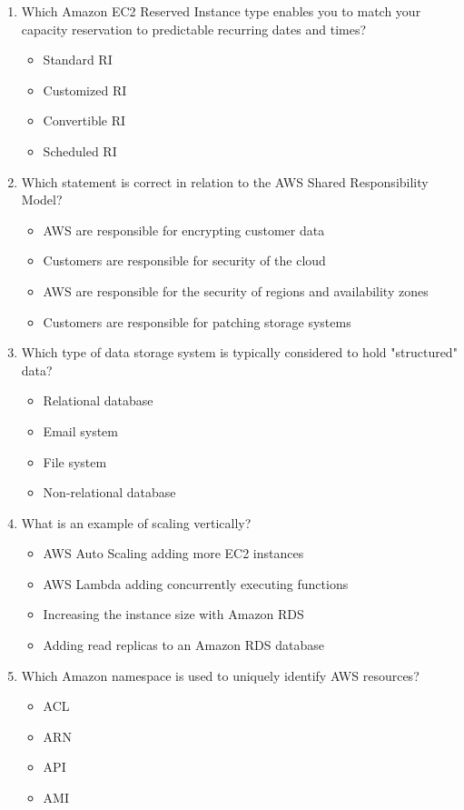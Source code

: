 \begin{enumerate}
	\item Which Amazon EC2 Reserved Instance type enables you to match your capacity reservation to predictable recurring dates and times?
	\begin{itemize}
		\item Standard RI
		\item Customized RI
		\item Convertible RI
		\item Scheduled RI
	\end{itemize}

	\item Which statement is correct in relation to the AWS Shared Responsibility Model?
	\begin{itemize}
		\item AWS are responsible for encrypting customer data
		\item Customers are responsible for security of the cloud
		\item AWS are responsible for the security of regions and availability zones
		\item Customers are responsible for patching storage systems
	\end{itemize}

	\item Which type of data storage system is typically considered to hold "structured" data?
	\begin{itemize}
		\item Relational database
		\item Email system
		\item File system
		\item Non-relational database
	\end{itemize}

	\item What is an example of scaling vertically?
	\begin{itemize}
		\item AWS Auto Scaling adding more EC2 instances
		\item AWS Lambda adding concurrently executing functions
		\item Increasing the instance size with Amazon RDS
		\item Adding read replicas to an Amazon RDS database
	\end{itemize}

	\item Which Amazon namespace is used to uniquely identify AWS resources?
	\begin{itemize}
		\item ACL
		\item ARN
		\item API
		\item AMI
	\end{itemize}


\end{enumerate}
